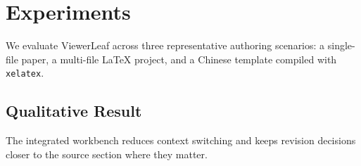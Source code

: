 \section{Experiments}
We evaluate ViewerLeaf across three representative authoring scenarios: a single-file paper, a multi-file LaTeX project, and a Chinese template compiled with \texttt{xelatex}.

\subsection{Qualitative Result}
The integrated workbench reduces context switching and keeps revision decisions closer to the source section where they matter.
